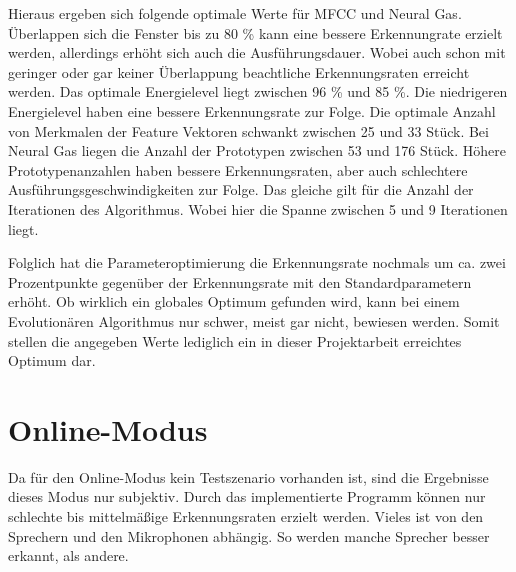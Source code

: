 Hieraus ergeben sich folgende optimale Werte für MFCC und Neural Gas. Überlappen sich die Fenster bis zu 80 \% kann eine bessere Erkennungrate erzielt werden, allerdings erhöht sich auch die Ausführungsdauer. Wobei auch schon mit geringer oder gar keiner Überlappung beachtliche Erkennungsraten erreicht werden. Das optimale Energielevel liegt zwischen 96 \% und 85 \%. Die niedrigeren Energielevel haben eine bessere Erkennungsrate zur Folge. Die optimale Anzahl von Merkmalen der Feature Vektoren schwankt zwischen 25 und 33 Stück. Bei Neural Gas liegen die Anzahl der Prototypen zwischen 53 und 176 Stück. Höhere Prototypenanzahlen haben bessere Erkennungsraten, aber auch schlechtere Ausführungsgeschwindigkeiten zur Folge. Das gleiche gilt für die Anzahl der Iterationen des Algorithmus. Wobei hier die Spanne zwischen 5 und 9 Iterationen liegt.

Folglich hat die Parameteroptimierung die Erkennungsrate nochmals um ca. zwei Prozentpunkte gegenüber der Erkennungsrate mit den Standardparametern erhöht. Ob wirklich ein globales Optimum gefunden wird, kann bei einem Evolutionären Algorithmus nur schwer, meist gar nicht, bewiesen werden. Somit stellen die angegeben Werte lediglich ein in dieser Projektarbeit erreichtes Optimum dar.

\section{Online-Modus}
Da für den Online-Modus kein Testszenario vorhanden ist, sind die Ergebnisse dieses Modus nur subjektiv. Durch das implementierte Programm können nur schlechte bis mittelmäßige Erkennungsraten erzielt werden. Vieles ist von den Sprechern und den Mikrophonen abhängig. So werden manche Sprecher besser erkannt, als andere.
